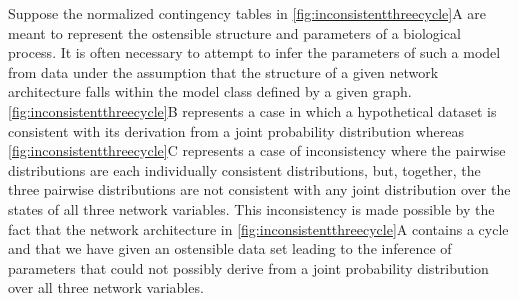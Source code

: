 Suppose the normalized contingency tables in \ref{fig:inconsistentthreecycle}A are meant to represent the ostensible structure and parameters of a biological process. It is often necessary to attempt to infer the parameters of such a model from data under the assumption that the structure of a given network architecture falls within the model class defined by a given graph. \ref{fig:inconsistentthreecycle}B represents a case in which a hypothetical dataset is consistent with its derivation from a joint probability distribution whereas \ref{fig:inconsistentthreecycle}C represents a case of inconsistency where the pairwise distributions are each individually consistent distributions, but, together, the three pairwise distributions are not consistent with any joint distribution over the states of all three network variables.
This inconsistency is made possible by the fact that the network architecture in \ref{fig:inconsistentthreecycle}A contains a cycle \cite{Lauritzen1996,Geiger2006,Wainwright2007} and that we have given an ostensible data set leading to the inference of parameters that could not possibly derive from a joint probability distribution over all three network variables.

